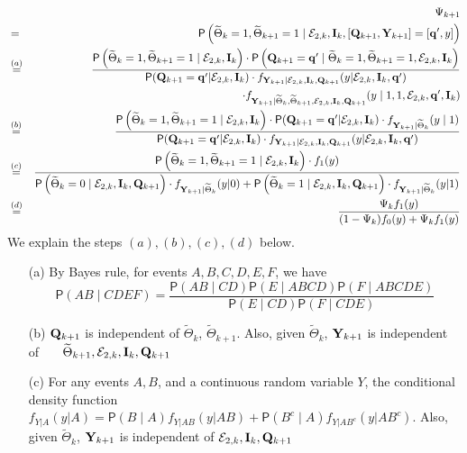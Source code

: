 \documentclass[acmtosn]{acmtrans2m}
\newcommand{\prob}[1]{\mathsf{P}\left(#1\right)}
\newcommand{\nn}{\nonumber \\}
{\theorembodyfont{\rmfamily}
\newtheorem{remarks}{Remark}[section]} \newtheorem{theorem}{Theorem}
\begin{document}
\begin{itemize}
{\footnotesize
\begin{eqnarray*}
& & \Psi_{k+1}\nn
& = & \prob{\widetilde\Theta_k = 1, \widetilde\Theta_{k+1}=1\mid {\mathcal E}_{2,k}, {\bf
I}_{k}, [{\mathbf Q}_{k+1}, {\bf Y}_{k+1}]=[{\bf q}',y]}\\ 
& 
\stackrel{(a)}{=} & \frac{ \prob{\widetilde\Theta_k = 1,
\widetilde\Theta_{k+1}=1\mid {\mathcal E}_{2,k},  {\bf I}_{k}} \cdot
\prob{{\bf Q}_{k+1} = {\bf q}' \mid \widetilde\Theta_k = 1,
\widetilde\Theta_{k+1}=1, {\mathcal E}_{2,k},  {\bf I}_{k}}}
{
{\mathsf P}({\bf Q}_{k+1}={\bf q}'|{\mathcal E}_{2,k}, {\bf I}_k)
\cdot f_{{\bf Y}_{k+1}\mid {\mathcal E}_{2,k}, {\bf I}_k, {\bf Q}_{k+1}}
(y|{\mathcal E}_{2,k}, {\bf I}_k,{\bf q}')
 } \nn
& & 
\cdot f_{{\bf Y}_{k+1}\mid \widetilde\Theta_k, \widetilde\Theta_{k+1},
{\mathcal E}_{2,k}, {\bf I}_k, {\bf Q}_{k+1} }
(y\mid 1, 1, {\mathcal E}_{2,k}, {\bf q}', {\bf I}_k )\nn 
& \stackrel{(b)}{=} & \frac{ \prob{\widetilde\Theta_k = 1, \widetilde\Theta_{k+1}=1\mid {\mathcal E}_{2,k}, {\bf I}_{k}} \cdot
{\mathsf P}({\bf Q}_{k+1}={\bf q}'|{\mathcal E}_{2,k}, {\bf I}_k)
\cdot f_{{\bf Y}_{k+1}\mid \widetilde\Theta_k}
(y\mid 1 ) }{
{\mathsf P}({\bf Q}_{k+1}={\bf q}'|{\mathcal E}_{2,k}, {\bf I}_k)
\cdot   f_{{\bf Y}_{k+1}\mid {\mathcal E}_{2,k}, {\bf I}_k, {\bf Q}_{k+1}}
(y|{\mathcal E}_{2,k}, {\bf I}_k,{\bf q}')
 } \nn
& \stackrel{(c)}{=} & \frac{ \prob{\widetilde\Theta_k = 1, \widetilde\Theta_{k+1}=1\mid {\mathcal E}_{2,k}, {\bf I}_{k}} 
\cdot f_1(y)}{
\prob{\widetilde\Theta_k=0 \mid {\mathcal E}_{2,k}, {\bf I}_k, {\bf
Q}_{k+1}}\cdot f_{{\bf Y}_{k+1}\mid \widetilde\Theta_k
}(y|0)
+
\prob{\widetilde\Theta_k=1 \mid {\mathcal E}_{2,k}, {\bf I}_k, {\bf
Q}_{k+1}}\cdot f_{{\bf Y}_{k+1}\mid \widetilde\Theta_k
}(y|1)
} \nn
& \stackrel{(d)}{=} & \frac{ \Psi_k f_1(y) } { (1-\Psi_k)  f_0(y) +\Psi_k f_1(y) } 
\end{eqnarray*}
}
We explain the steps $(a), (b), (c), (d)$ below.
\begin{itemize}
\item[(a)] By Bayes rule, for events $A,B,C,D,E,F$, we have 
 \[\prob{A B \mid C D E F} = 
           \frac{\prob{A B \mid C D} \prob{E \mid A B C D} \prob{F \mid A
		   B C D E }}{\prob{E\mid C D}\prob{F \mid C D E}}\] 
\item[(b)] ${\bf Q}_{k+1}$ is independent of $\widetilde\Theta_k$,
$\widetilde\Theta_{k+1}$. Also, given $\widetilde\Theta_k$, 
${\bf Y}_{k+1}$ is independent of \ \ \ $\widetilde\Theta_{k+1},
{\mathcal E}_{2,k}, {\bf I}_k, {\bf Q}_{k+1}$

\item[(c)] For any events $A,B$, and a continuous random variable $Y$,
the conditional density
           function $f_{Y|A}(y|A) = \prob{B \mid A}  f_{Y|AB}(y|AB) + \prob{B^c \mid A}
		   f_{Y|A B^c}(y|A B^c)$. Also,  given $\widetilde\Theta_k$, 
${\bf Y}_{k+1}$ is independent of 
${\mathcal E}_{2,k}, {\bf I}_k, {\bf Q}_{k+1}$


\end{itemize}
\end{itemize}
\end{document}
